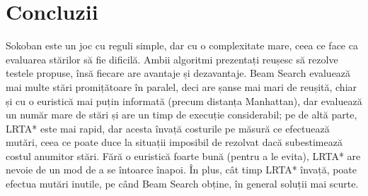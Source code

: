 \documentclass{article}
\begin{document}
\section{Concluzii}
Sokoban este un joc cu reguli simple, dar cu o complexitate mare, ceea ce face
ca evaluarea stărilor să fie dificilă. Ambii algoritmi prezentați reușesc să 
rezolve testele propuse, însă fiecare are avantaje și dezavantaje. Beam Search
evaluează mai multe stări promițătoare în paralel, deci are șanse mai mari de 
reușită, chiar și cu o euristică mai puțin informată (precum distanța 
Manhattan), dar evaluează un număr mare de stări și are un timp de execuție 
considerabil; pe de altă parte, LRTA* este mai rapid, dar acesta învață 
costurile pe măsură ce efectuează mutări, ceea ce poate duce la situații 
imposibil de rezolvat dacă subestimează costul anumitor stări. Fără o euristică
foarte bună (pentru a le evita), LRTA* are nevoie de un mod de a se întoarce
înapoi. În plus, cât timp LRTA* învață, poate efectua mutări inutile, pe când 
Beam Search obține, în general soluții mai scurte.
\end{document}
